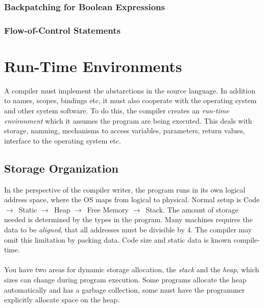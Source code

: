 \documentclass{article}
\newcommand{\ta}{$\to$~}
\begin{document}
\subsubsection{Backpatching for Boolean Expressions} %
\label{ssub:Backpatching for Boolean Expressions}


\subsubsection{Flow-of-Control Statements} %
\label{ssub:Flow-of-Control Statements}




\section{Run-Time Environments} %
\label{sec:Run-Time Environments}
A compiler must implement the abstarctions in the source language. In addition to names, scopes, bindings etc, it must also cooperate with the operating system and other system software. To do this, the compiler creates an \emph{run-time environment} which it assumes the program are being executed. This deals with storage, namning, mechanisms to access variables, parameters, return values, interface to the operating system etc.

\subsection{Storage Organization} %
\label{sub:Storage Organization}
In the perspective of the compiler writer, the program runs in its own logical address space, where the OS maps from logical to physical. Normal setup is Code \ta Static \ta Heap \ta Free Memory \ta Stack. The amount of storage needed is determined by the types in the program. Many machines requires the data to be \emph{aligned}, that all addresses must be divisible by 4. The compiler may omit this limitation by packing data. Code size and static data is known compile-time.\\
\\
You have two areas for dynamic storage allocation, the \emph{stack} and the \emph{heap}, which sizes can change during program execution. Some programs allocate the heap automatically and has a garbage collection, some must have the programmer explicitly allocate space on the heap.
\end{document}
